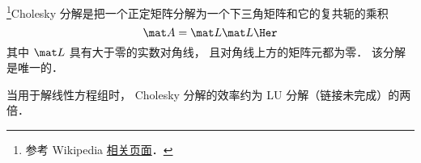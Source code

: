 
\begin{issues}
\issueDraft
\end{issues}


\footnote{参考 Wikipedia \href{https://en.wikipedia.org/wiki/Cholesky_decomposition}{相关页面}．}Cholesky 分解是把一个正定矩阵分解为一个下三角矩阵和它的复共轭的乘积
\begin{equation}
\mat A = \mat L \mat L\Her
\end{equation}
其中 $\mat L$ 具有大于零的实数对角线， 且对角线上方的矩阵元都为零． 该分解是唯一的．

当用于解线性方程组时， Cholesky 分解的效率约为 LU 分解（链接未完成）的两倍．
